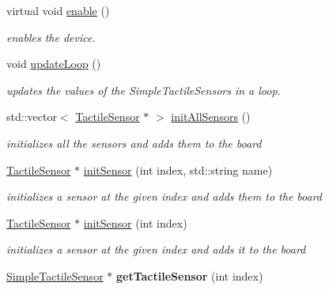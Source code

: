 \begin{DoxyCompactItemize}
\item 
virtual void \hyperlink{classdrobot_1_1device_1_1tactile_1_1SimpleTactileSensorBoard_a1660e1e8cd1d5705936a28ce9294d759}{enable} ()
\begin{DoxyCompactList}\small\item\em enables the device. \end{DoxyCompactList}\item 
void \hyperlink{classdrobot_1_1device_1_1tactile_1_1SimpleTactileSensorBoard_aa857348183ae4940a545fc67440129ce}{update\-Loop} ()
\begin{DoxyCompactList}\small\item\em updates the values of the Simple\-Tactile\-Sensors in a loop. \end{DoxyCompactList}\item 
std\-::vector$<$ \hyperlink{classdrobot_1_1device_1_1tactile_1_1TactileSensor}{Tactile\-Sensor} $\ast$ $>$ \hyperlink{classdrobot_1_1device_1_1tactile_1_1SimpleTactileSensorBoard_ac2097d7088c8b86f1597d5dcc1a7f447}{init\-All\-Sensors} ()
\begin{DoxyCompactList}\small\item\em initializes all the sensors and adds them to the board \end{DoxyCompactList}\item 
\hyperlink{classdrobot_1_1device_1_1tactile_1_1TactileSensor}{Tactile\-Sensor} $\ast$ \hyperlink{classdrobot_1_1device_1_1tactile_1_1SimpleTactileSensorBoard_a1469177db6d4de1c320bd24cc7750d65}{init\-Sensor} (int index, std\-::string name)
\begin{DoxyCompactList}\small\item\em initializes a sensor at the given index and adds them to the board \end{DoxyCompactList}\item 
\hyperlink{classdrobot_1_1device_1_1tactile_1_1TactileSensor}{Tactile\-Sensor} $\ast$ \hyperlink{classdrobot_1_1device_1_1tactile_1_1SimpleTactileSensorBoard_a2c793a9f64826941dd58dc2ddcbd3283}{init\-Sensor} (int index)
\begin{DoxyCompactList}\small\item\em initializes a sensor at the given index and adds it to the board \end{DoxyCompactList}\item 
\hypertarget{classdrobot_1_1device_1_1tactile_1_1SimpleTactileSensorBoard_a978ec8471e2589de983e9b1195dcc9ed}{\hyperlink{classdrobot_1_1device_1_1tactile_1_1SimpleTactileSensor}{Simple\-Tactile\-Sensor} $\ast$ {\bfseries get\-Tactile\-Sensor} (int index)}\label{classdrobot_1_1device_1_1tactile_1_1SimpleTactileSensorBoard_a978ec8471e2589de983e9b1195dcc9ed}

\end{DoxyCompactItemize}
